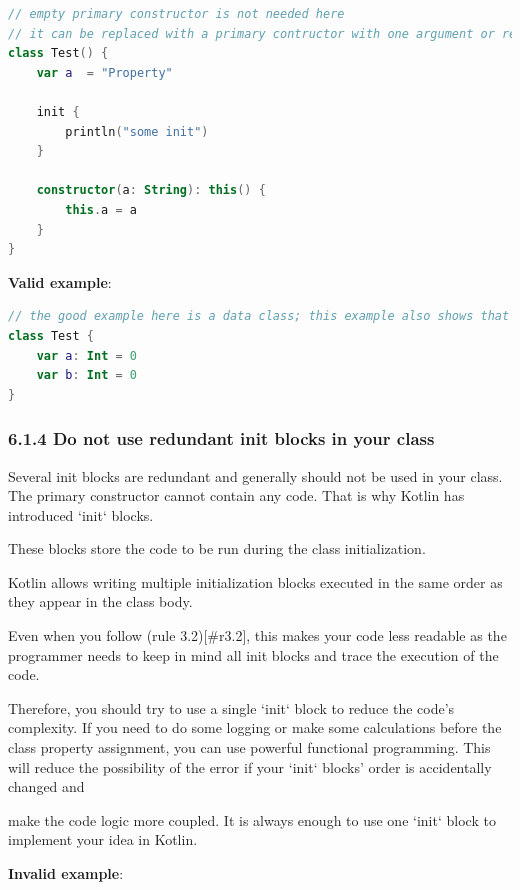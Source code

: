 {{{{\begin{lstlisting}[language=Kotlin]
// empty primary constructor is not needed here
// it can be replaced with a primary contructor with one argument or removed
class Test() {
    var a  = "Property"

    init {
        println("some init")
    }

    constructor(a: String): this() {
        this.a = a
    }
}
\end{lstlisting}


\textbf{Valid example}:

\begin{lstlisting}[language=Kotlin]
// the good example here is a data class; this example also shows that you should get rid of braces for the primary constructor
class Test {
    var a: Int = 0
    var b: Int = 0
}
\end{lstlisting}


\subsubsection*{\textbf{6.1.4 Do not use redundant init blocks in your class}}
\leavevmode\newline

\label{sec:6.1.4}

Several init blocks are redundant and generally should not be used in your class. The primary constructor cannot contain any code. That is why Kotlin has introduced `init` blocks.

These blocks store the code to be run during the class initialization.

Kotlin allows writing multiple initialization blocks executed in the same order as they appear in the class body.

Even when you follow (rule 3.2)[\#r3.2], this makes your code less readable as the programmer needs to keep in mind all init blocks and trace the execution of the code.

Therefore, you should try to use a single `init` block to reduce the code's complexity. If you need to do some logging or make some calculations before the class property assignment, you can use powerful functional programming. This will reduce the possibility of the error if your `init` blocks' order is accidentally changed and

make the code logic more coupled. It is always enough to use one `init` block to implement your idea in Kotlin.



\textbf{Invalid example}:

}}}}
